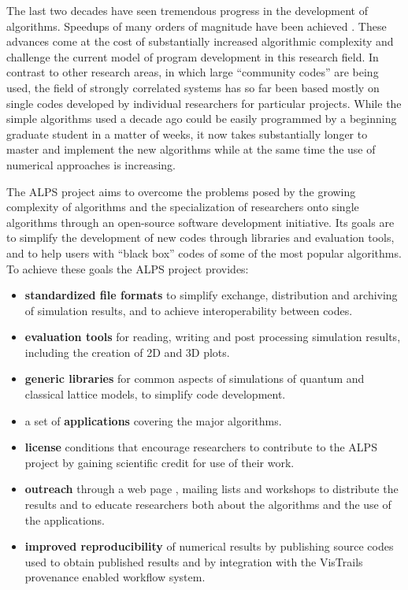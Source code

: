 \documentclass[12pt]{iopart}
\begin{document}
The last two decades have seen tremendous progress in the development of
algorithms.  Speedups of many orders of magnitude have been 
achieved \cite{Evertz03,Troyer03,White1992,Schollwock2005,vidal1,vidal2,Daley2004,White2004,Rubtsov04,Rubtsov05,Werner06,Werner06Kondo, Gull08_ctaux}. These
advances come at the cost of substantially increased algorithmic
complexity and challenge the current model of program development in
this research field. In contrast to other research areas, in which
large ``community codes'' are being used, the field of strongly
correlated systems has so far been based mostly on single codes developed by
individual researchers for particular projects. While the simple
algorithms used a decade ago could be easily programmed by a beginning
graduate student in a matter of weeks, it now takes substantially
longer to master and implement the new algorithms while at the same time the use of numerical approaches is increasing.  

The ALPS project aims to
overcome the problems posed by the growing complexity of algorithms
and the specialization of researchers onto single algorithms through
an open-source software development initiative. Its goals are to simplify the development of new codes through libraries and evaluation tools, and to help users with ``black box'' codes of some of the most popular algorithms. To achieve these goals the ALPS project provides:
\begin{itemize}
\item {\bf standardized file formats} to simplify exchange,
distribution and archiving of simulation results, and to achieve
interoperability between codes.

\item {\bf evaluation tools} for reading, writing and post processing simulation results, including the creation of 2D and 3D plots.

\item {\bf generic libraries} for common aspects of
simulations of quantum and classical lattice models, to simplify code
development.
\item a set of {\bf applications} covering the major algorithms.
\item{\bf license} conditions \cite{librarylicense,applicationlicense} that encourage researchers to contribute
to the ALPS project by gaining scientific credit for use of their
work.
\item {\bf outreach} through a web page \cite{alps}, mailing lists and
workshops to distribute the results and to educate researchers both
about the algorithms and the use of the applications.
\item {\bf improved reproducibility} of numerical results by
publishing source codes used to obtain published results and by integration with the VisTrails \cite{vistrails} provenance enabled workflow system.
\end{itemize}
\end{document}
